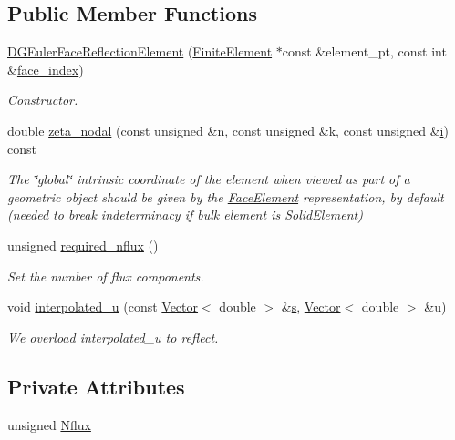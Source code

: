\subsection*{Public Member Functions}
\begin{DoxyCompactItemize}
\item 
\hyperlink{classoomph_1_1DGEulerFaceReflectionElement_abf3440cd3556c0d9f968dab2a4b90c24}{D\+G\+Euler\+Face\+Reflection\+Element} (\hyperlink{classoomph_1_1FiniteElement}{Finite\+Element} $\ast$const \&element\+\_\+pt, const int \&\hyperlink{classoomph_1_1FaceElement_a478d577ac6db67ecc80f1f02ae3ab170}{face\+\_\+index})
\begin{DoxyCompactList}\small\item\em Constructor. \end{DoxyCompactList}\item 
double \hyperlink{classoomph_1_1DGEulerFaceReflectionElement_a0abd251e086372b7d18e06713890e25c}{zeta\+\_\+nodal} (const unsigned \&n, const unsigned \&k, const unsigned \&\hyperlink{cfortran_8h_adb50e893b86b3e55e751a42eab3cba82}{i}) const
\begin{DoxyCompactList}\small\item\em The \char`\"{}global\char`\"{} intrinsic coordinate of the element when viewed as part of a geometric object should be given by the \hyperlink{classoomph_1_1FaceElement}{Face\+Element} representation, by default (needed to break indeterminacy if bulk element is Solid\+Element) \end{DoxyCompactList}\item 
unsigned \hyperlink{classoomph_1_1DGEulerFaceReflectionElement_a51f6048bc1f1c033933c65430dd0c323}{required\+\_\+nflux} ()
\begin{DoxyCompactList}\small\item\em Set the number of flux components. \end{DoxyCompactList}\item 
void \hyperlink{classoomph_1_1DGEulerFaceReflectionElement_a288fa54f9022aac4bf060ca19a0c8a67}{interpolated\+\_\+u} (const \hyperlink{classoomph_1_1Vector}{Vector}$<$ double $>$ \&\hyperlink{cfortran_8h_ab7123126e4885ef647dd9c6e3807a21c}{s}, \hyperlink{classoomph_1_1Vector}{Vector}$<$ double $>$ \&u)
\begin{DoxyCompactList}\small\item\em We overload interpolated\+\_\+u to reflect. \end{DoxyCompactList}\end{DoxyCompactItemize}
\subsection*{Private Attributes}
\begin{DoxyCompactItemize}
\item 
unsigned \hyperlink{classoomph_1_1DGEulerFaceReflectionElement_afdb06b622f23a5ccea9173283d68df2f}{Nflux}
\end{DoxyCompactItemize}
